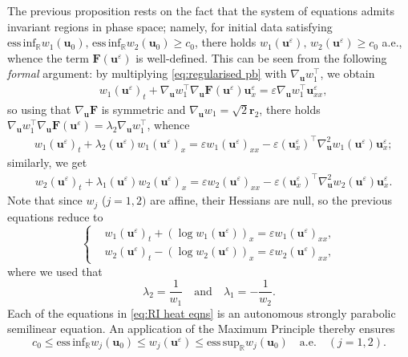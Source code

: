 \documentclass[11pt,a4paper,reqno]{amsart}
\numberwithin{equation}{section}
\theoremstyle{definition}
\theoremstyle{remark}
\newcommand{\bu}{\mathbf{u}}
\newcommand{\bF}{\mathbf{F}}
\newcommand{\br}{\mathbf{r}}
\newcommand{\esssup}{\mathrm{ess \, sup}}
\newcommand{\essinf}{\mathrm{ess \, inf}}
\renewcommand{\leq}{\leqslant}
\renewcommand{\geq}{\geqslant}
\begin{document}
{The previous proposition rests on the fact that the system of equations admits invariant regions in phase space; namely, for initial data satisfying $\essinf_\mathbb{R} w_1(\bu_0) , \, \essinf_\mathbb{R} w_2(\bu_0) \geq c_0$, there holds $w_1(\bu^\varepsilon) , \, w_2(\bu^\varepsilon) \geq c_0$ a.e., whence the term $\bF(\bu^\varepsilon)$ is well-defined. This can be seen from the following \emph{formal} argument: by multiplying \eqref{eq:regularised pb} with $\nabla_{\bu} w_1^\intercal$, we obtain 
\begin{equation*}
    \begin{aligned}
        & w_1(\bu^\varepsilon)_t + \nabla_{\bu} w_1^\intercal \nabla_\bu \bF(\bu^\varepsilon) \bu^\varepsilon_x = \varepsilon\nabla_{\bu} w_1^\intercal \bu^\varepsilon_{xx},
    \end{aligned}
\end{equation*}
so using that $\nabla_\bu \bF$ is symmetric and $\nabla_\bu w_1 = \sqrt{2}\br_2$, there holds $\nabla_{\bu} w_1^\intercal \nabla_\bu \bF(\bu^\varepsilon) = \lambda_2 \nabla_\bu w_1^\intercal$, whence 
\begin{equation*}
    \begin{aligned}
        & w_1(\bu^\varepsilon)_t + \lambda_2(\bu^\varepsilon) w_1(\bu^\varepsilon)_x = \varepsilon w_1(\bu^\varepsilon)_{xx} - \varepsilon(\bu^\varepsilon_x)^\intercal \nabla_\bu^2 w_1 (\bu^\varepsilon) \bu^\varepsilon_x; 
    \end{aligned}
\end{equation*}
similarly, we get 
\begin{equation*}
    \begin{aligned}
        & w_2(\bu^\varepsilon)_t + \lambda_1(\bu^\varepsilon) w_2(\bu^\varepsilon)_x = \varepsilon w_2(\bu^\varepsilon)_{xx} - \varepsilon(\bu^\varepsilon_x)^\intercal \nabla_\bu^2 w_2 (\bu^\varepsilon) \bu^\varepsilon_x. 
    \end{aligned}
\end{equation*}
Note that since $w_j$ ($j=1,2)$ are affine, their Hessians are null, so the previous equations reduce to 
\begin{equation}\label{eq:RI heat eqns}
   \left\lbrace \begin{aligned}
        & w_1(\bu^\varepsilon)_t + (\log w_1(\bu^\varepsilon))_x = \varepsilon w_1(\bu^\varepsilon)_{xx}, \\ 
        & w_2(\bu^\varepsilon)_t - (\log w_2(\bu^\varepsilon))_x = \varepsilon w_2(\bu^\varepsilon)_{xx}, 
    \end{aligned}\right. 
\end{equation}
where we used that $$\lambda_2 = \frac{1}{w_1} \quad \text{and} \quad \lambda_1 = -\frac{1}{w_2}.$$ Each of the equations in \eqref{eq:RI heat eqns} is an autonomous strongly parabolic semilinear equation. An application of the Maximum Principle thereby ensures $$ c_0 \leq \essinf_\mathbb{R} w_j(\bu_0) \leq w_j(\bu^\varepsilon) \leq \esssup_\mathbb{R} w_j(\bu_0) \quad \text{a.e.} \quad (j=1,2).$$




}
\end{document}

